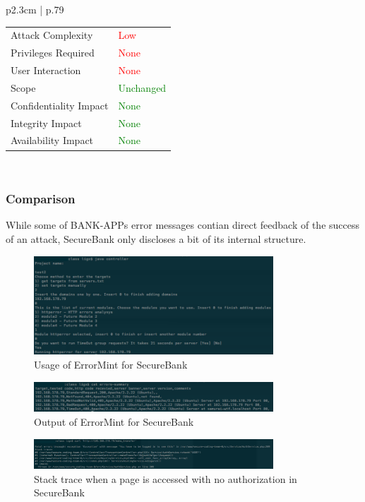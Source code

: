 \begin{longtable}{ p{2.3cm} | p{.79\linewidth} }
\begin{tabular}[t]{@{}l | l}
            Attack Complexity       & \textcolor{red}{Low} \\
            Privileges Required     & \textcolor{red}{None} \\
            User Interaction        & \textcolor{red}{None} \\
            Scope                   & \textcolor{Green}{Unchanged} \\
            Confidentiality Impact  & \textcolor{Green}{None} \\
            Integrity Impact        & \textcolor{Green}{None} \\
            Availability Impact     & \textcolor{Green}{None}
        \end{tabular}
    \\ \hline
\end{longtable}

\subsubsection{Comparison}
While some of BANK-APPs error messages contian direct feedback of the success of an attack, SecureBank only discloses a bit of its internal structure.
\begin{figure}[p]
    \centering
    \includegraphics[width=0.8\textwidth]{figures/OTG-ERR-001-1.png}
    \caption{Usage of ErrorMint for SecureBank}
    \label{fig:OTG_ERR_001_1}
\end{figure}
\begin{figure}[p]
    \centering
    \includegraphics[width=0.8\textwidth]{figures/OTG-ERR-001-2.png}
    \caption{Output of ErrorMint for SecureBank}
    \label{fig:OTG_ERR_001_2}
\end{figure}
\begin{figure}[p]
    \centering
    \includegraphics[width=0.8\textwidth]{figures/OTG-ERR-001-3.png}
    \caption{Stack trace when a page is accessed with no authorization in SecureBank}
    \label{fig:OTG_ERR_001_3}
\end{figure}
\clearpage